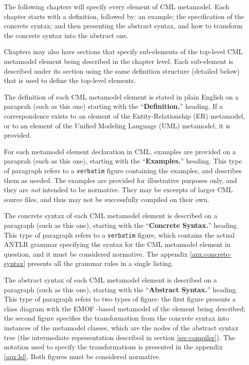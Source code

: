 The following chapters will specify every element of CML metamodel.
Each chapter starts with a definition, followed by: an example;
the specification of the concrete syntax;
and then presenting the abstract syntax,
and how to transform the concrete syntax into the abstract one.

Chapters may also have sections that specify sub-elements
of the top-level CML metamodel element being described in the chapter level.
Each sub-element is described under its section
using the same definition structure (detailed below)
that is used to define the top-level elements.

\begin{definition}
The definition of each CML metamodel element is stated in plain English
on a paraprah (such as this one)
starting with the ``\textbf{Definition.}'' heading.
If a correspondence exists to an element of
the Entity-Relationship (ER) \cite{er} metamodel,
or to an element of the Unified Modeling Language (UML) \cite{uml} metamodel,
it is provided.
\end{definition}

\begin{examples}
For each metamodel element declaration in CML,
examples are provided on a paraprah (such as this one),
starting with the ``\textbf{Examples.}'' heading.
This type of paragraph refers to a \verb+verbatim+ figure
containing the examples, and describes them as needed.
The examples are provided for illustrative purposes only,
and they are \emph{not} intended to be normative.
They may be excerpts of larger CML source files,
and thus may not be successfully compiled on their own.
\end{examples}

\begin{concrete-syntax}
The concrete syntax of each CML metamodel element is described
on a paragraph (such as this one),
starting with the ``\textbf{Concrete Syntax.}'' heading.
This type of paragraph refers to a \verb+verbatim+ figure,
which contains the actual ANTLR \cite{antlr} grammar
specifying the syntax for the CML metamodel element in question,
and it must be considered normative.
The appendix \ref{apx:concrete-syntax} presents all the grammar rules
in a single listing.
\end{concrete-syntax}

\begin{abstract-syntax}
The abstract syntax of each CML metamodel element is described
on a paragraph (such as this one),
starting with the ``\textbf{Abstract Syntax.}'' heading.
This type of paragraph refers to two types of figure:
the first figure presents a class diagram
with the EMOF \cite{mof}-based metamodel
of the element being described;
the second figure specifies the transformation
from the concrete syntax into instances of the metamodel classes,
which are the nodes of the abstract syntax tree
(the intermediate representation described in section \ref{sec:compiler}).
The notation used to specify the transformations is presented
in the appendix \ref{apx:lsl}.
Both figures must be considered normative.
\end{abstract-syntax}

